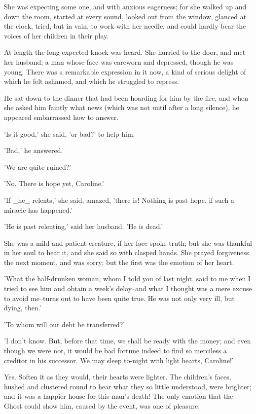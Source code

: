 She was expecting some one, and with anxious eagerness; for she walked
up and down the room, started at every sound, looked out from the
window, glanced at the clock, tried, but in vain, to work with her
needle, and could hardly bear the voices of her children in their play.

At length the long-expected knock was heard. She hurried to the door,
and met her husband; a man whose face was careworn and depressed, though
he was young. There was a remarkable expression in it now, a kind of
serious delight of which he felt ashamed, and which he struggled to
repress.

He sat down to the dinner that had been hoarding for him by the fire,
and when she asked him faintly what news (which was not until after a
long silence), he appeared embarrassed how to answer.

'Is it good,' she said, 'or bad?' to help him.

'Bad,' he answered.

'We are quite ruined?'

'No. There is hope yet, Caroline.'

'If _he_ relents,' she said, amazed, 'there is! Nothing is past hope, if
such a miracle has happened.'

'He is past relenting,' said her husband. 'He is dead.'

She was a mild and patient creature, if her face spoke truth; but she
was thankful in her soul to hear it, and she said so with clasped hands.
She prayed forgiveness the next moment, and was sorry; but the first was
the emotion of her heart.

'What the half-drunken woman, whom I told you of last night, said to me
when I tried to see him and obtain a week's delay--and what I thought
was a mere excuse to avoid me--turns out to have been quite true. He was
not only very ill, but dying, then.'

'To whom will our debt be transferred?'

'I don't know. But, before that time, we shall be ready with the money;
and even though we were not, it would be bad fortune indeed to find so
merciless a creditor in his successor. We may sleep to-night with light
hearts, Caroline!'

Yes. Soften it as they would, their hearts were lighter. The children's
faces, hushed and clustered round to hear what they so little
understood, were brighter; and it was a happier house for this man's
death! The only emotion that the Ghost could show him, caused by the
event, was one of pleasure.

